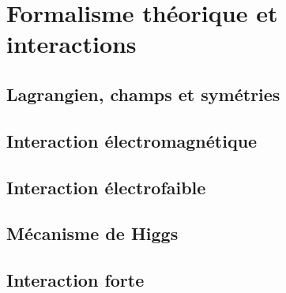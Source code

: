 \section{Formalisme théorique et interactions}
\subsection{Lagrangien, champs et symétries}
\subsection{Interaction électromagnétique}
\subsection{Interaction électrofaible}
\subsection{Mécanisme de Higgs}
\subsection{Interaction forte}

